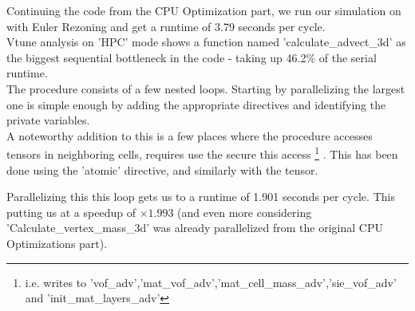 Continuing the code from the CPU Optimization
part, we run our simulation on with Euler Rezoning
and get a runtime of 3.79 seconds per cycle.\\

Vtune analysis on 'HPC' mode shows
a function named 'calculate\_advect\_3d' 
as the biggest sequential bottleneck in the code - 
taking up 46.2\% of the serial runtime.\\

The procedure consists of a few nested loops.
Starting by parallelizing the largest one is simple
enough by adding the appropriate directives and identifying the private variables.\\
A noteworthy addition to this is a few places
where the procedure accesses
tensors in neighboring cells, requires use the secure this access
\footnote{i.e. writes to 'vof\_adv','mat\_vof\_adv','mat\_cell\_mass\_adv','sie\_vof\_adv'
and 'init\_mat\_layers\_adv'}
.
This has been done using the 'atomic' directive,
and similarly with the 
tensor.

Parallelizing this this loop gets us to
a runtime of 1.901 seconds per cycle.
This putting us at a speedup of $\times 1.993$
(and even more considering 'Calculate\_vertex\_mass\_3d'
was already parallelized from the original CPU Optimizations part).\\